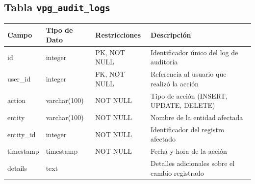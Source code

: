 \begin{center}
	\subsection{Tabla \texttt{vpg\_audit\_logs}}
	\small
	\begin{tabular}{|l|l|l|p{6cm}|}
		\hline
		\textbf{Campo} & \textbf{Tipo de Dato} & \textbf{Restricciones} & \textbf{Descripción}                            \\
		\hline
		id             & integer               & PK, NOT NULL           & Identificador único del log de auditoría        \\
		user\_id       & integer               & FK, NOT NULL           & Referencia al usuario que realizó la acción     \\
		action         & varchar(100)          & NOT NULL               & Tipo de acción (INSERT, UPDATE, DELETE)         \\
		entity         & varchar(100)          & NOT NULL               & Nombre de la entidad afectada                   \\
		entity\_id     & integer               & NOT NULL               & Identificador del registro afectado             \\
		timestamp      & timestamp             & NOT NULL               & Fecha y hora de la acción                       \\
		details        & text                  &                        & Detalles adicionales sobre el cambio registrado \\
		\hline
	\end{tabular}
	\normalsize
\end{center}

